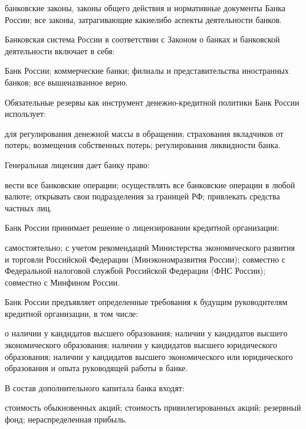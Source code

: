 \documentclass[12pt, table]{exam}
\begin{document}
\begin{questions}
\begin{multicols}{2}
\begin{choices}
	 \choice банковские законы, законы общего действия и нормативные документы Банка России;
	 \choice все законы, затрагивающие какиелибо аспекты деятельности банков.
	 \end{choices}
\question Банковская система России в соответствии с Законом о банках и банковской деятельности включает в себя:
	 \begin{choices}
	 \choice Банк России;
	 \CC коммерческие банки;
	 \choice филиалы и представительства иностранных банков;
	 \choice все вышеназванное верно.
	 \end{choices}
\question Обязательные резервы как инструмент денежно-кредитной политики Банк России использует:
	 \begin{choices}
	 \choice для регулирования денежной массы в обращении;
	 \choice страхования вкладчиков от потерь;
	 \choice возмещения собственных потерь;
	 \CC регулирования ликвидности банка.
	 \end{choices}
\question Генеральная лицензия дает банку право:
	 \begin{choices}
	 \CC вести все банковские операции;
	 \choice осуществлять все банковские операции в любой валюте;
	 \choice открывать свои подразделения за границей РФ;
	 \choice привлекать средства частных лиц.
	 \end{choices}
\question Банк России принимает решение о лицензировании кредитной организации:
	 \begin{choices}
	 \CC самостоятельно;
	 \choice с учетом рекомендаций Министерства экономического развития и торговли Российской Федерации (Минэкономразвития России);
	 \choice совместно с Федеральной налоговой службой Российской Федерации (ФНС России);
	 \choice совместно с Минфином России.
	 \end{choices}
\question Банк России предъявляет определенные требования к будущим руководителям кредитной организации, в том числе:
	 \begin{choices}
	 \choice о наличии у кандидатов высшего образования;
	 \choice наличии у кандидатов высшего экономического образования;
	 \choice наличии у кандидатов высшего юридического образования;
	 \CC наличии у кандидатов высшего экономического или юридического образования и опыта руководящей работы в банке.
	 \end{choices}
\question В состав дополнительного капитала банка входят:
	 \begin{choices}
	 \choice стоимость обыкновенных акций;
	 \CC стоимость привилегированных акций;
	 \choice резервный фонд;
	 \choice нераспределенная прибыль.

\end{choices}
\end{multicols}
\end{questions}
\end{document}
